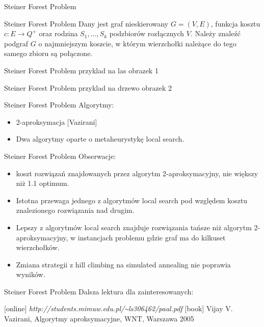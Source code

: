 \begin{frame}{Steiner Forest Problem}
\begin{block}{Steiner Forest Problem}
 Dany jest graf nieskierowany $G = (V, E)$, funkcja kosztu $c: E \rightarrow Q^+$ oraz rodzina $S_1, \hdots, S_k$ podzbiorów rozłącznych $V$. Należy znaleźć podgraf $G$ o najmniejszym koszcie, w którym wierzchołki należące do tego samego zbioru są połączone.
\end{block}
\end{frame}

\begin{frame}{Steiner Forest Problem}
przyklad na las
obrazek 1
\end{frame}

\begin{frame}{Steiner Forest Problem}
przyklad na drzewo
obrazek 2
\end{frame}

\begin{frame}{Steiner Forest Problem}
Algorytmy:
\begin{itemize}
\item 2-aproksymacja [Vazirani]
\item Dwa algorytmy oparte o metaheurystykę local search.
\end{itemize}
\end{frame}

\begin{frame}{Steiner Forest Problem}
Obserwacje:
\begin{itemize}
\item koszt rozwiązań znajdowanych przez algorytm 2-aproksymacyjny, nie większy niż 1.1 optimum.
\item Istotna przewaga jednego z algorytmów local search pod względem kosztu znalezionego rozwiązania nad drugim.
\item Lepszy z algorytmów local search znajduje rozwiązania tańsze niż algorytm 2-aproksymacyjny, w instancjach problemu gdzie graf ma do kilkuset wierzchołków.
\item Zmiana strategii z hill climbing na simulated annealing nie poprawia wyników.
\end{itemize}
\end{frame}

\begin{frame}{Steiner Forest Problem}
Dalsza lektura dla zainteresowanych:
\begin{thebibliography}{9}
[online]
 {\em http://students.mimuw.edu.pl/\textasciitilde ls306462/paal.pdf}
[book]
 Vijay V. Vazirani, Algorytmy aproksymacyjne, WNT, Warszawa 2005
\end{thebibliography}
\end{frame}
